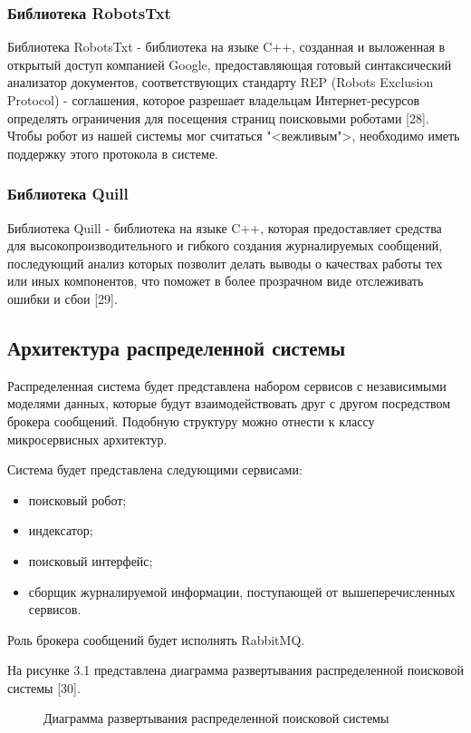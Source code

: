 \subsubsection{Библиотека RobotsTxt}

Библиотека RobotsTxt - библиотека на языке C++, созданная и выложенная в открытый доступ компанией Google, предоставляющая готовый синтаксический анализатор документов, соответствующих стандарту REP (Robots Exclusion Protocol) - соглашения, которое разрешает владельцам Интернет-ресурсов определять ограничения для посещения страниц поисковыми роботами [28]. Чтобы робот из нашей системы мог считаться "<вежливым">, необходимо иметь поддержку этого протокола в системе.

\subsubsection{Библиотека Quill}
Библиотека Quill - библиотека на языке C++, которая предоставляет средства для высокопроизводительного и гибкого создания журналируемых сообщений, последующий анализ которых позволит делать выводы о качествах работы тех или иных компонентов, что поможет в более прозрачном виде отслеживать ошибки и сбои [29].

\subsection{Архитектура распределенной системы}

Распределенная система будет представлена набором сервисов с независимыми моделями данных, которые будут взаимодействовать друг с другом посредством брокера сообщений. Подобную структуру можно отнести к классу микросервисных архитектур.

Система будет представлена следующими сервисами:
\begin{itemize}
\item поисковый робот;
\item индексатор;
\item поисковый интерфейс;
\item сборщик журналируемой информации, поступающей от вышеперечисленных сервисов.
\end{itemize}

Роль брокера сообщений будет исполнять RabbitMQ.

На рисунке 3.1 представлена диаграмма развертывания распределенной поисковой системы [30].

\begin{figure}[H]
\caption{Диаграмма развертывания распределенной поисковой системы}
\label{diagram_deployment:image}
\end{figure}

